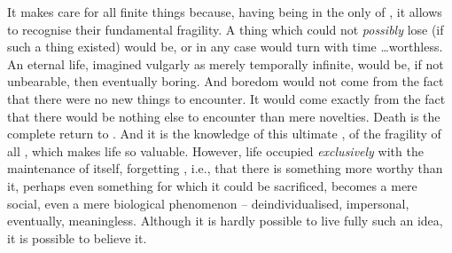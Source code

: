 It makes  care for all finite things because, having
  being in the only  of
, it allows  to recognise their fundamental
fragility. A thing which  could not {\em possibly} lose (if such a
thing existed) would be, or in any case would turn with time
\ldots worthless. An eternal life, imagined vulgarly as merely temporally
infinite, would be, if not unbearable, then eventually boring. And
boredom would not come from the fact that there were no new things to
encounter. It would come exactly from the fact that there would be
nothing else to encounter than mere novelties.
Death is the complete return to . And it is the
knowledge of this ultimate , of the fragility of all
, which makes life so valuable. However, life occupied
{\em exclusively} with the maintenance of itself, forgetting ,
i.e., that there is something more worthy than it, perhaps even something
for which it could be sacrificed, becomes a mere social, even a mere
biological phenomenon -- deindividualised, impersonal, eventually,
meaningless. Although it is hardly possible to live fully such an idea, it is
possible to  believe it.

